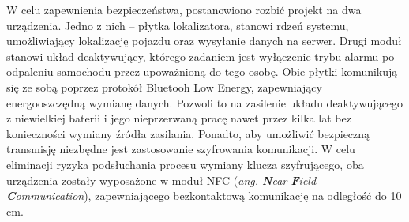 W celu zapewnienia bezpieczeństwa, postanowiono rozbić projekt na dwa urządzenia. Jedno z nich – płytka lokalizatora, stanowi rdzeń systemu, umożliwiający lokalizację pojazdu oraz wysyłanie danych na serwer. Drugi moduł stanowi układ deaktywujący, którego zadaniem jest wyłączenie trybu alarmu po odpaleniu samochodu przez upoważnioną do tego osobę. Obie płytki komunikują się ze sobą poprzez protokół Bluetooh Low Energy, zapewniający energooszczędną wymianę danych. Pozwoli to na zasilenie układu deaktywującego z niewielkiej baterii i jego nieprzerwaną pracę nawet przez kilka lat bez konieczności wymiany źródła zasilania. 
Ponadto, aby umożliwić  bezpieczną transmisję niezbędne jest zastosowanie szyfrowania komunikacji. W celu eliminacji ryzyka podsłuchania procesu wymiany klucza szyfrującego, oba urządzenia zostały wyposażone w moduł NFC (\textit{ang. \textbf{N}ear \textbf{F}ield \textbf{C}ommunication}), zapewniającego bezkontaktową komunikację na odległość do 10 cm.